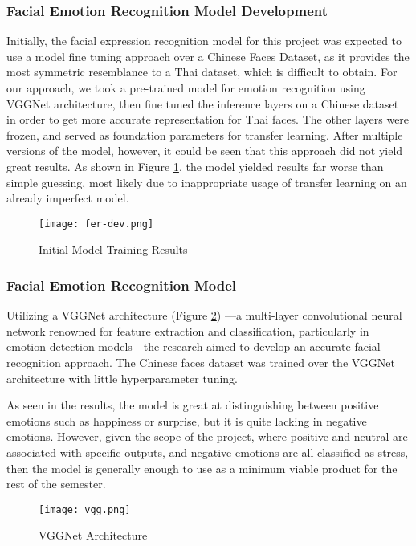 \newpage
\subsubsection{Facial Emotion Recognition Model Development}
Initially, the facial expression recognition model for this project was expected to use a model fine tuning approach over a Chinese Faces Dataset, as it provides the most symmetric resemblance to a Thai dataset, which is difficult to obtain. For our approach, we took a pre-trained model for emotion recognition using VGGNet architecture, then fine tuned the inference layers on a Chinese dataset in order to get more accurate representation for Thai faces. The other layers were frozen, and served as foundation parameters for transfer learning. After multiple versions of the model, however, it could be seen that this approach did not yield great results. As shown in Figure \ref{fig:fer-dev}, the model yielded results far worse than simple guessing, most likely due to inappropriate usage of transfer learning on an already imperfect model.

\begin{figure}[!ht]
    \centering
    \captionsetup{justification=centering}
    \texttt{[image: fer-dev.png]}
    \caption{Initial Model Training Results}
    \label{fig:fer-dev}
\end{figure}

\newpage
\subsubsection{Facial Emotion Recognition Model}
Utilizing a VGGNet \cite{simonyan2015deepconvolutionalnetworkslargescale} architecture (Figure \ref{fig:vgg}) —a multi-layer convolutional neural network renowned for feature extraction and classification, particularly in emotion detection models—the research aimed to develop an accurate facial recognition approach. The Chinese faces dataset was trained over the VGGNet architecture with little hyperparameter tuning.

As seen in the results, the model is great at distinguishing between positive emotions such as happiness or surprise, but it is quite lacking in negative emotions. However, given the scope of the project, where positive and neutral are associated with specific outputs, and negative emotions are all classified as stress, then the model is generally enough to use as a minimum viable product for the rest of the semester.

\begin{figure}[!ht]
    \centering
    \captionsetup{justification=centering}
    \texttt{[image: vgg.png]}
    \caption{VGGNet Architecture}
    \label{fig:vgg}
\end{figure}

